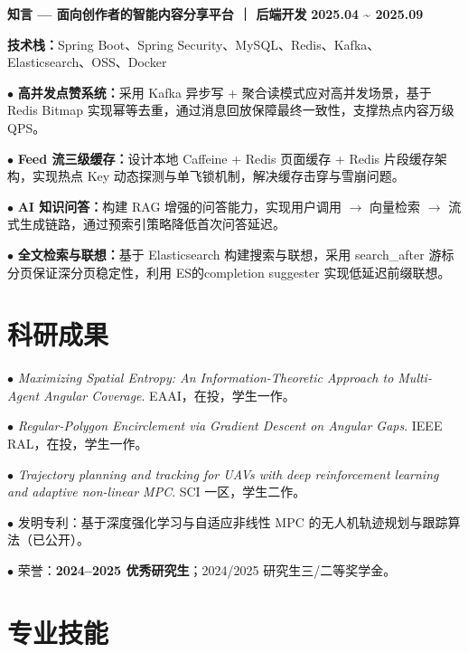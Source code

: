 \documentclass[11pt,a4paper,fontset=none]{ctexart}
\newcommand{\daterange}[1]{{\textbf{#1}}}
\newcommand{\entrytitle}[1]{{\textbf{#1}}}
\begin{document}
\vspace{0.4em}
\noindent
\entrytitle{知言 — 面向创作者的智能内容分享平台 ｜ 后端开发}
\hfill \daterange{2025.04 \textasciitilde{} 2025.09}

\par\noindent
\textbf{技术栈：}Spring Boot、Spring Security、MySQL、Redis、Kafka、Elasticsearch、OSS、Docker

\par\noindent
$\bullet$ \textbf{高并发点赞系统：}采用 Kafka 异步写 + 聚合读模式应对高并发场景，基于 Redis Bitmap 实现幂等去重，通过消息回放保障最终一致性，支撑热点内容万级 QPS。

\par\noindent
$\bullet$ \textbf{Feed 流三级缓存：}设计本地 Caffeine + Redis 页面缓存 + Redis 片段缓存架构，实现热点 Key 动态探测与单飞锁机制，解决缓存击穿与雪崩问题。

\par\noindent
$\bullet$ \textbf{AI 知识问答：}构建 RAG 增强的问答能力，实现用户调用 $\rightarrow$ 向量检索 $\rightarrow$ 流式生成链路，通过预索引策略降低首次问答延迟。

\par\noindent
$\bullet$ \textbf{全文检索与联想：}基于 Elasticsearch 构建搜索与联想，采用 search\_after 游标分页保证深分页稳定性，利用 ES的completion suggester 实现低延迟前缀联想。

\section*{科研成果}
\vspace{-0.1em}

\noindent
$\bullet$ \textit{Maximizing Spatial Entropy: An Information-Theoretic Approach to Multi-Agent Angular Coverage}. EAAI，在投，学生一作。
\par\noindent
$\bullet$ \textit{Regular-Polygon Encirclement via Gradient Descent on Angular Gaps}. IEEE RAL，在投，学生一作。
\par\noindent
$\bullet$ \textit{Trajectory planning and tracking for UAVs with deep reinforcement learning and adaptive non-linear MPC}. SCI 一区，学生二作。
\par\noindent
$\bullet$ 发明专利：基于深度强化学习与自适应非线性 MPC 的无人机轨迹规划与跟踪算法（已公开）。
\par\noindent
$\bullet$ 荣誉：\textbf{2024--2025 优秀研究生}；2024/2025 研究生三/二等奖学金。

\section*{专业技能}
\vspace{-0.1em}
\end{document}
